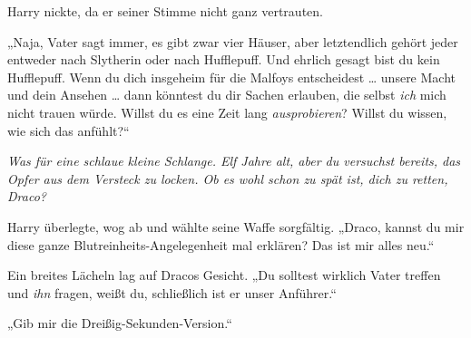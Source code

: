 Harry nickte, da er seiner Stimme nicht ganz vertrauten.

„Naja, Vater sagt immer, es gibt zwar vier Häuser, aber letztendlich gehört jeder entweder nach Slytherin oder nach Hufflepuff. Und ehrlich gesagt bist du kein Hufflepuff. Wenn du dich insgeheim für die Malfoys entscheidest … unsere Macht und dein Ansehen … dann könntest du dir Sachen erlauben, die selbst \emph{ich} mich nicht trauen würde. Willst du es eine Zeit lang \emph{ausprobieren}? Willst du wissen, wie sich das anfühlt?“

\emph{Was für eine schlaue kleine Schlange. Elf Jahre alt, aber du versuchst bereits, das Opfer aus dem Versteck zu locken. Ob es wohl schon zu spät ist, dich zu retten, Draco?}

Harry überlegte, wog ab und wählte seine Waffe sorgfältig.
„Draco, kannst du mir diese ganze Blutreinheits-Angelegenheit mal erklären? Das ist mir alles neu.“

Ein breites Lächeln lag auf Dracos Gesicht.
„Du solltest wirklich Vater treffen und \emph{ihn} fragen, weißt du, schließlich ist er unser Anführer.“

„Gib mir die Dreißig-Sekunden-Version.“%

